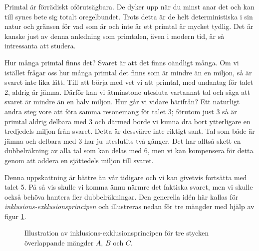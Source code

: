 
Primtal är förrädiskt oförutsägbara.
De dyker upp när du minst anar det och kan till synes bete sig totalt oregelbundet.
Trots detta är de helt deterministiska i sin natur och gränsen för vad som är och inte är ett primtal är mycket tydlig.
Det är kanske just av denna anledning som primtalen, även i modern tid, är så intressanta att studera.


Hur många primtal finns det? Svaret är att det finns oändligt många.
Om vi istället frågar oss hur många primtal det finns som är mindre än en miljon, så är svaret inte lika lätt.
Till att börja med vet vi att primtal, med undantag för talet 2, aldrig är jämna.
Därför kan vi åtminstone utesluta vartannat tal och säga att svaret är mindre än en halv miljon.
Hur går vi vidare härifrån?
Ett naturligt andra steg vore att föra samma resonemang för talet 3;
förutom just 3 så är primtal aldrig delbara med 3 och därmed borde vi kunna dra bort ytterligare en tredjedels miljon från svaret.
Detta är dessvärre inte riktigt sant.
Tal som både är jämna och delbara med 3 har ju uteslutits två gånger.
Det har alltså skett en dubbelräkning av alla tal som kan delas med 6,
men vi kan kompensera för detta genom att addera en sjättedels miljon till svaret.


Denna uppskattning är bättre än vår tidigare och vi kan givetvis fortsätta med talet 5.
På så vis skulle vi komma ännu närmre det faktiska svaret, 
men vi skulle också behöva hantera fler dubbelräkningar.
Den generella idén här kallas för \textit{inklusions-exklusionsprincipen} och illustreras nedan för tre mängder med hjälp av figur \ref{pop.fig}.

\begin{figure}[H]
    \centering
    
    \caption{Illustration av inklusions-exklusionsprincipen för tre stycken överlappande mängder $A$, $B$ och $C$.}
    \label{pop.fig}
\end{figure}


